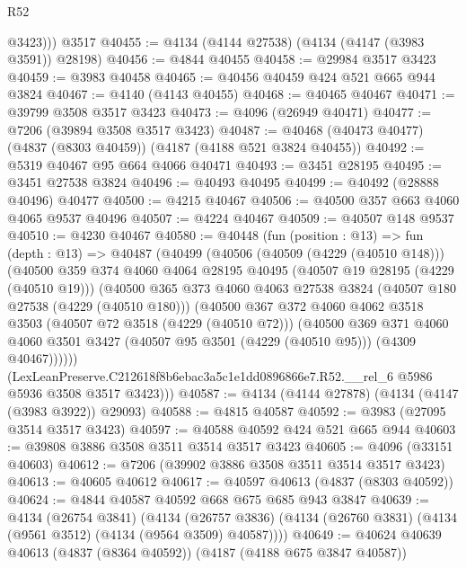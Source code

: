 \begin{lexlean}{R52}
\begin{coremodule}
          @3423)))
    @3517
@40455 := @4134 (@4144 @27538) (@4134 (@4147 (@3983 @3591)) @28198)
@40456 := @4844 @40455
@40458 := @29984 @3517 @3423
@40459 := @3983 @40458
@40465 := @40456 @40459 @424 @521 @665 @944 @3824
@40467 := @4140 (@4143 @40455)
@40468 := @40465 @40467
@40471 := @39799 @3508 @3517 @3423
@40473 := @4096 (@26949 @40471)
@40477 := @7206 (@39894 @3508 @3517 @3423)
@40487 := @40468 (@40473 @40477) (@4837 (@8303 @40459)) (@4187 (@4188 @521 @3824 @40455))
@40492 := @5319 @40467 @95 @664 @4066 @40471
@40493 := @3451 @28195
@40495 := @3451 @27538 @3824
@40496 := @40493 @40495
@40499 := @40492 (@28888 @40496) @40477
@40500 := @4215 @40467
@40506 := @40500 @357 @663 @4060 @4065 @9537 @40496
@40507 := @4224 @40467
@40509 := @40507 @148 @9537
@40510 := @4230 @40467
@40580 := @40448
    (fun (position : @13) =>
    fun (depth : @13) =>
    @40487
      (@40499
        (@40506
          (@40509 (@4229 (@40510 @148)))
          (@40500
            @359
            @374
            @4060
            @4064
            @28195
            @40495
            (@40507 @19 @28195 (@4229 (@40510 @19)))
            (@40500
              @365
              @373
              @4060
              @4063
              @27538
              @3824
              (@40507 @180 @27538 (@4229 (@40510 @180)))
              (@40500
                @367
                @372
                @4060
                @4062
                @3518
                @3503
                (@40507 @72 @3518 (@4229 (@40510 @72)))
                (@40500
                  @369
                  @371
                  @4060
                  @4060
                  @3501
                  @3427
                  (@40507 @95 @3501 (@4229 (@40510 @95)))
                  (@4309 @40467))))))
        (LexLeanPreserve.C212618f8b6ebac3a5c1e1dd0896866e7.R52.__rel_6
          @5986
          @5936
          @3508
          @3517
          @3423)))
@40587 := @4134 (@4144 @27878) (@4134 (@4147 (@3983 @3922)) @29093)
@40588 := @4815 @40587
@40592 := @3983 (@27095 @3514 @3517 @3423)
@40597 := @40588 @40592 @424 @521 @665 @944
@40603 := @39808 @3886 @3508 @3511 @3514 @3517 @3423
@40605 := @4096 (@33151 @40603)
@40612 := @7206 (@39902 @3886 @3508 @3511 @3514 @3517 @3423)
@40613 := @40605 @40612
@40617 := @40597 @40613 (@4837 (@8303 @40592))
@40624 := @4844 @40587 @40592 @668 @675 @685 @943 @3847
@40639 := @4134
    (@26754 @3841)
    (@4134 (@26757 @3836) (@4134 (@26760 @3831) (@4134 (@9561 @3512) (@4134 (@9564 @3509) @40587))))
@40649 := @40624 @40639 @40613 (@4837 (@8364 @40592)) (@4187 (@4188 @675 @3847 @40587))

\end{coremodule}
\end{lexlean}
